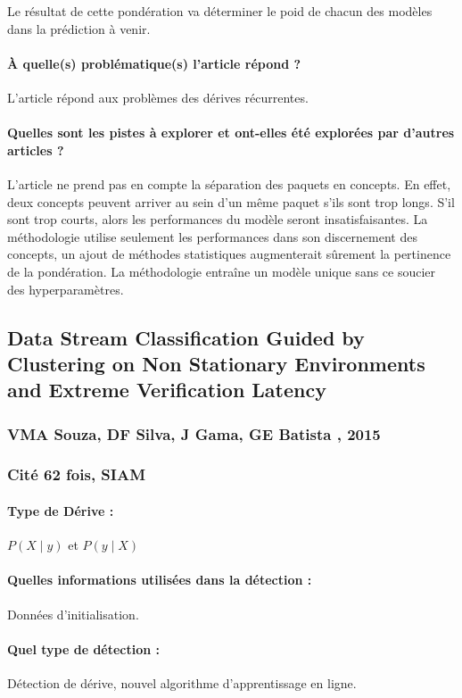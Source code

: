 \documentclass[11pt,a4paper]{report}
\begin{document}
Le résultat de cette pondération va déterminer le poid de chacun des modèles dans la prédiction à venir.


\paragraph{À quelle(s) problématique(s) l'article répond ?} L'article répond aux problèmes des dérives récurrentes.

\paragraph{Quelles sont les pistes à explorer et ont-elles été explorées par d'autres articles ?} L'article ne prend pas en compte la séparation des paquets en concepts. En effet, deux concepts peuvent arriver au sein d'un même paquet s'ils sont trop longs. S'il sont trop courts, alors les performances du modèle seront insatisfaisantes. La méthodologie utilise seulement les performances dans son discernement des concepts, un ajout de méthodes statistiques augmenterait sûrement la pertinence de la pondération. La méthodologie entraîne un modèle unique sans ce soucier des hyperparamètres.




\subsection{Data Stream Classification Guided by Clustering on Non Stationary Environments and Extreme Verification Latency}
\subsubsection{VMA Souza, DF Silva, J Gama, GE Batista , 2015}
\subsubsection{Cité 62 fois, SIAM}

\paragraph{Type de Dérive :} $P(X\mid y)$ et $P(y \mid X)$
\paragraph{Quelles informations utilisées dans la détection :} Données d'initialisation.
\paragraph{Quel type de détection :} Détection de dérive, nouvel algorithme d'apprentissage en ligne.
\end{document}
